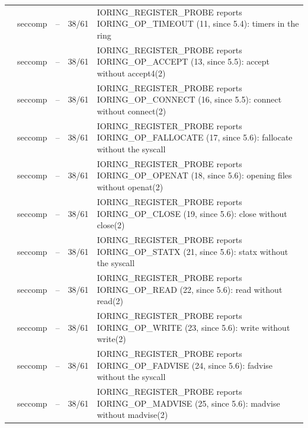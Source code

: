 \begin{longtable}{@{}P{4.4cm}P{1.35cm}R{0.75cm}R{0.95cm}P{7.65cm}@{}}
 & seccomp & -- & 38/61 & IORING\_\allowbreak{}REGISTER\_\allowbreak{}PROBE reports IORING\_\allowbreak{}OP\_\allowbreak{}TIMEOUT (11, since 5.4): timers in the ring \\
 & seccomp & -- & 38/61 & IORING\_\allowbreak{}REGISTER\_\allowbreak{}PROBE reports IORING\_\allowbreak{}OP\_\allowbreak{}ACCEPT (13, since 5.5): accept without accept4(2) \\
 & seccomp & -- & 38/61 & IORING\_\allowbreak{}REGISTER\_\allowbreak{}PROBE reports IORING\_\allowbreak{}OP\_\allowbreak{}CONNECT (16, since 5.5): connect without connect(2) \\
 & seccomp & -- & 38/61 & IORING\_\allowbreak{}REGISTER\_\allowbreak{}PROBE reports IORING\_\allowbreak{}OP\_\allowbreak{}FALLOCATE (17, since 5.6): fallocate without the syscall \\
 & seccomp & -- & 38/61 & IORING\_\allowbreak{}REGISTER\_\allowbreak{}PROBE reports IORING\_\allowbreak{}OP\_\allowbreak{}OPENAT (18, since 5.6): opening files without openat(2) \\
 & seccomp & -- & 38/61 & IORING\_\allowbreak{}REGISTER\_\allowbreak{}PROBE reports IORING\_\allowbreak{}OP\_\allowbreak{}CLOSE (19, since 5.6): close without close(2) \\
 & seccomp & -- & 38/61 & IORING\_\allowbreak{}REGISTER\_\allowbreak{}PROBE reports IORING\_\allowbreak{}OP\_\allowbreak{}STATX (21, since 5.6): statx without the syscall \\
 & seccomp & -- & 38/61 & IORING\_\allowbreak{}REGISTER\_\allowbreak{}PROBE reports IORING\_\allowbreak{}OP\_\allowbreak{}READ (22, since 5.6): read without read(2) \\
 & seccomp & -- & 38/61 & IORING\_\allowbreak{}REGISTER\_\allowbreak{}PROBE reports IORING\_\allowbreak{}OP\_\allowbreak{}WRITE (23, since 5.6): write without write(2) \\
 & seccomp & -- & 38/61 & IORING\_\allowbreak{}REGISTER\_\allowbreak{}PROBE reports IORING\_\allowbreak{}OP\_\allowbreak{}FADVISE (24, since 5.6): fadvise without the syscall \\
 & seccomp & -- & 38/61 & IORING\_\allowbreak{}REGISTER\_\allowbreak{}PROBE reports IORING\_\allowbreak{}OP\_\allowbreak{}MADVISE (25, since 5.6): madvise without madvise(2) \\

\end{longtable}
